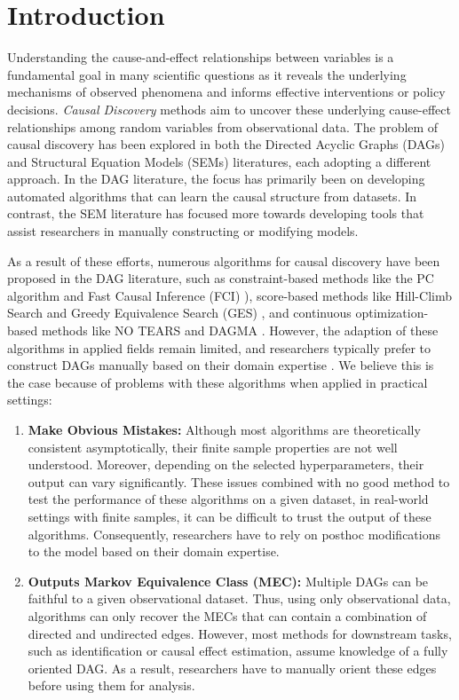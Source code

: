 \documentclass[letterpaper]{article} %
\begin{document}
\section{Introduction}

Understanding the cause-and-effect relationships between variables is a
fundamental goal in many scientific questions as it reveals the underlying
mechanisms of observed phenomena and informs effective interventions or policy
decisions. \emph{Causal Discovery} methods aim to uncover these underlying
cause-effect relationships among random variables from observational data. The
problem of causal discovery has been explored in both the Directed Acyclic
Graphs (DAGs) and Structural Equation Models (SEMs) literatures, each adopting
a different approach. In the DAG literature, the focus has primarily been on
developing automated algorithms that can learn the causal structure from
datasets. In contrast, the SEM literature has focused more towards developing
tools that assist researchers in manually constructing or modifying models.

As a result of these efforts, numerous algorithms for causal discovery have
been proposed in the DAG literature, such as constraint-based methods like the
PC algorithm \citep{Spirtes2001} and Fast Causal Inference (FCI)
\citep{Spirtes2000}), score-based methods like Hill-Climb Search and Greedy
Equivalence Search (GES) \citep{Chickering2002}, and continuous
optimization-based methods like NO TEARS \citep{Zheng2018} and DAGMA
\citep{Bello2022}. However, the adaption of these algorithms in applied fields
remain limited, and researchers typically prefer to construct DAGs manually
based on their domain expertise \citep{Tennant2020, Petersen2021}. We believe this 
is the case because of problems with these algorithms when applied in practical
settings:

\begin{enumerate}
	\item \textbf{Make Obvious Mistakes:} Although most algorithms are
		theoretically consistent asymptotically, their finite sample
		properties are not well understood. Moreover, depending on the
		selected hyperparameters, their output can vary significantly.
		These issues combined with no good method to test the
		performance of these algorithms on a given dataset, in
		real-world settings with finite samples, it can be difficult to
		trust the output of these algorithms. Consequently, researchers
		have to rely on posthoc modifications to the model based on
		their domain expertise.
	\item \textbf{Outputs Markov Equivalence Class (MEC):} Multiple
		DAGs can be faithful to a given observational dataset. Thus,
		using only observational data, algorithms can only recover the
		MECs that can contain a combination of directed and undirected
		edges. However, most methods for downstream tasks, such as
		identification or causal effect estimation, assume knowledge of
		a fully oriented DAG. As a result, researchers have to manually
		orient these edges before using them for analysis.
\end{enumerate}
\end{document}
